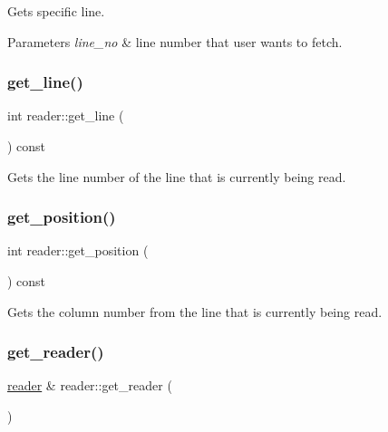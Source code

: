 Gets specific line.


\begin{DoxyParams}{Parameters}
{\em line\+\_\+no} & line number that user wants to fetch. \\
\hline
\end{DoxyParams}
\mbox{\label{classjawe_1_1reader_aef5335166d86ae9613b81ecbd00add3a}} 
\subsubsection{\texorpdfstring{get\+\_\+line()}{get\_line()}\hspace{0.1cm}{\footnotesize\ttfamily [2/2]}}
{\footnotesize\ttfamily int reader\+::get\+\_\+line (\begin{DoxyParamCaption}{ }\end{DoxyParamCaption}) const}

Gets the line number of the line that is currently being read. \mbox{\label{classjawe_1_1reader_a29fdb5657f0ce40bdc84c1b71f37db80}} 
\subsubsection{\texorpdfstring{get\+\_\+position()}{get\_position()}}
{\footnotesize\ttfamily int reader\+::get\+\_\+position (\begin{DoxyParamCaption}{ }\end{DoxyParamCaption}) const}

Gets the column number from the line that is currently being read. \mbox{\label{classjawe_1_1reader_a2b5f844b23c223dfbbb8b180cd706f62}} 
\subsubsection{\texorpdfstring{get\+\_\+reader()}{get\_reader()}}
{\footnotesize\ttfamily \hyperlink{classjawe_1_1reader}{reader} \& reader\+::get\+\_\+reader (\begin{DoxyParamCaption}{ }\end{DoxyParamCaption})\hspace{0.3cm}{\ttfamily [static]}}


